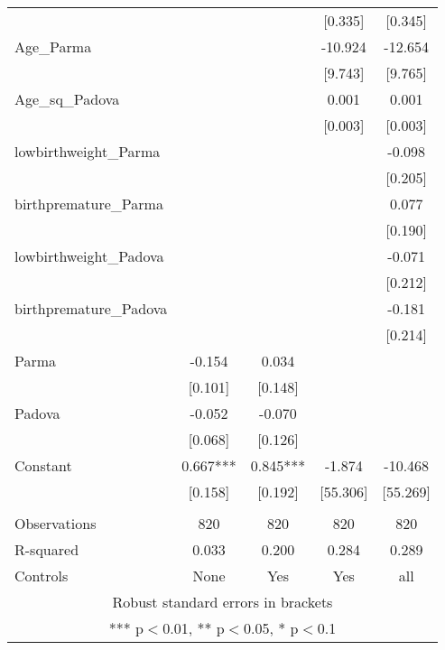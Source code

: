 \documentclass[]{article}
\begin{document}
\begin{tabular}{lcccc}
 &  &  & [0.335] & [0.345] \\
Age\_Parma &  &  & -10.924 & -12.654 \\
 &  &  & [9.743] & [9.765] \\
Age\_sq\_Padova &  &  & 0.001 & 0.001 \\
 &  &  & [0.003] & [0.003] \\
lowbirthweight\_Parma &  &  &  & -0.098 \\
 &  &  &  & [0.205] \\
birthpremature\_Parma &  &  &  & 0.077 \\
 &  &  &  & [0.190] \\
lowbirthweight\_Padova &  &  &  & -0.071 \\
 &  &  &  & [0.212] \\
birthpremature\_Padova &  &  &  & -0.181 \\
 &  &  &  & [0.214] \\
Parma & -0.154 & 0.034 &  &  \\
 & [0.101] & [0.148] &  &  \\
Padova & -0.052 & -0.070 &  &  \\
 & [0.068] & [0.126] &  &  \\
Constant & 0.667*** & 0.845*** & -1.874 & -10.468 \\
 & [0.158] & [0.192] & [55.306] & [55.269] \\
 &  &  &  &  \\
Observations & 820 & 820 & 820 & 820 \\
R-squared & 0.033 & 0.200 & 0.284 & 0.289 \\
 Controls & None & Yes & Yes & all \\ \hline
\multicolumn{5}{c}{ Robust standard errors in brackets} \\
\multicolumn{5}{c}{ *** p$<$0.01, ** p$<$0.05, * p$<$0.1} \\
\end{tabular}
\end{document}
